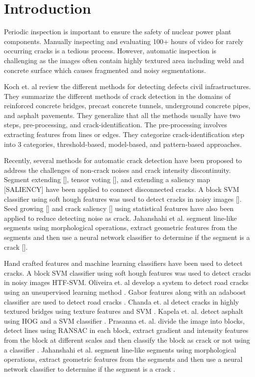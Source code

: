 

\section{Introduction}
Periodic inspection is important to ensure the safety of nuclear power plant components. Manually inspecting and evaluating 100+ hours of video for rarely occurring cracks is a tedious process. However, automatic inspection is challenging as the images often contain highly textured area including weld and concrete surface which causes fragmented and noisy segmentations.

Koch et. al \cite{koch2015review_survey} review the different methods for detecting defects civil infrastructures. They summarize the different methods of crack detection in the domains of reinforced concrete bridges, precast concrete tunnels, underground concrete pipes, and asphalt pavements. They generalize that all the methods usually have two steps, pre-processing, and crack-identification. The pre-processing involves extracting features from lines or edges. They categorize crack-identification step into 3 categories, threshold-based, model-based, and pattern-based approaches. 

Recently, several methods for automatic crack detection have been proposed to address the challenges of non-crack noises and crack intensity discontinuity. Segment extending [\cite{SEG_EXTEND}], tensor voting [\cite{ZouTensorVoting}], and extending a saliency map [SALIENCY] have been applied to connect disconnected cracks. A block SVM classifier using soft hough features was used to detect cracks in noisy images [\cite{HTF_SVM}]. Seed growing [\cite{SEED_GROW}] and crack saliency [\cite{SALIENCY}] using statistical features have also been applied to reduce detecting noise as crack. Jahanshahi et al. segment line-like segments using morphological operations, extract geometric features from the segments and then use a neural network classifier to determine if the segment is a crack [\cite{jahanshahi2013innovative}].

Hand crafted features and machine learning classifiers have been used to detect cracks. A block SVM classifier using soft hough features was used to detect cracks in noisy images HTF-SVM. Oliveira et. al develop a system to detect road cracks using an unsupervised learning method \cite{Oliveira2013_road_blockClassification} \cite{Oliveira2014_Road_Classify_ICIP}.  Gabor features along with an adaboost classifier are used to detect road cracks \cite{Medina2014_Road_GaborAdaboost}.  Chanda et. al  detect cracks in highly textured bridges using texture features and SVM \cite{chanda2014_bridges_textureSVM}. Kapela et. al. detect asphalt using HOG and a SVM classifier \cite{Kapela2015_Road_HOG_SVM}. Prasanna et. al. divide the image into blocks, detect lines using RANSAC in each block, extract gradient and intensity features from the block at different scales and then classify the block as crack or not using a classifier \cite{Prasanna2014_Bridges_classifierRANSAClines}. Jahanshahi et al. segment line-like segments using morphological operations, extract geometric features from the segments and then use a neural network classifier to determine if the segment is a crack \cite{jahanshahi2013innovative}. 

